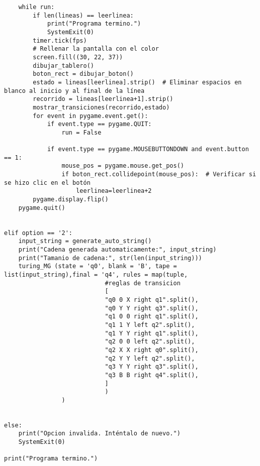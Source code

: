 \begin{lstlisting}
    while run:
        if len(lineas) == leerlinea:
            print("Programa termino.")
            SystemExit(0)
        timer.tick(fps)
        # Rellenar la pantalla con el color
        screen.fill((30, 22, 37))
        dibujar_tablero()
        boton_rect = dibujar_boton()
        estado = lineas[leerlinea].strip()  # Eliminar espacios en blanco al inicio y al final de la línea
        recorrido = lineas[leerlinea+1].strip()
        mostrar_transiciones(recorrido,estado)
        for event in pygame.event.get():
            if event.type == pygame.QUIT:
                run = False

            if event.type == pygame.MOUSEBUTTONDOWN and event.button == 1:
                mouse_pos = pygame.mouse.get_pos()
                if boton_rect.collidepoint(mouse_pos):  # Verificar si se hizo clic en el botón
                    leerlinea=leerlinea+2
        pygame.display.flip()
    pygame.quit()
  

elif option == '2':
    input_string = generate_auto_string()
    print("Cadena generada automaticamente:", input_string)
    print("Tamanio de cadena:", str(len(input_string)))
    turing_MG (state = 'q0', blank = 'B', tape = list(input_string),final = 'q4', rules = map(tuple,
                            #reglas de transicion
                            [
                            "q0 0 X right q1".split(),
                            "q0 Y Y right q3".split(),
                            "q1 0 0 right q1".split(),
                            "q1 1 Y left q2".split(),
                            "q1 Y Y right q1".split(),
                            "q2 0 0 left q2".split(),
                            "q2 X X right q0".split(),
                            "q2 Y Y left q2".split(),
                            "q3 Y Y right q3".split(),
                            "q3 B B right q4".split(),
                            ]   
                            )
                )
    
    
else:
    print("Opcion invalida. Inténtalo de nuevo.")
    SystemExit(0)

print("Programa termino.")

\end{lstlisting}